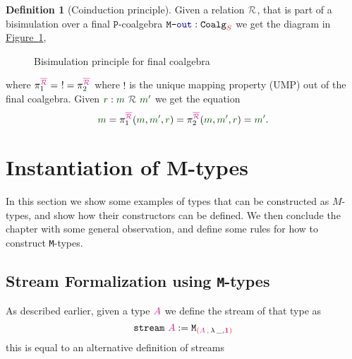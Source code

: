 \documentclass[twoside,11pt,openright]{report}
\theoremstyle{plain} %
\theoremstyle{definition}
\newtheorem{defn}[thm]{Definition}%
\theoremstyle{remark}
\newcommand*{\figref}[1]{\hyperref[fig:#1]{Figure~\ref*{fig:#1}}}
\newcommand*{\term}[1]{\textcolor{green!30!black}{#1}} %
\newcommand*{\type}[1]{\textcolor{magenta!90!black}{#1}}
\newcommand*{\container}[1]{\textcolor{red}{#1}}
\newcommand*{\containerpair}[2]{\ensuremath{\colorlet{savedleftcolor}{.}\color{red}\left(\color{savedleftcolor}#1\,\textcolor{red}{\mathbf{,}}\,#2\color{red}\right)\color{savedleftcolor}}}
\newcommand*{\unit}{\type{\textbf{1}}}
\newcommand*{\coalg}[2]{#1\texttt{-}#2}
\newcommand*{\relation}[1]{\textcolor{gray!75!black}{\ensuremath{\mathtt{#1}}}}
\newcommand*{\function}[1]{\textcolor{blue!60!black}{\ensuremath{\mathtt{#1}}}}
\newcommand*{\typeformer}[1]{\ensuremath{\mathtt{#1}}}
\newcommand*{\functor}[1]{\ensuremath{\mathbf{\mathtt{#1}}}}
\begin{document}
\begin{defn}[Coinduction principle]
  \noindent Given a relation \(\relation{\mathcal{R}}\), that is part of a bisimulation over a final \(\functor{P}\)-coalgebra \(\coalg{\typeformer{M}}{\function{out}}:\mathtt{Coalg}_{\container{S}}\) we get the diagram in \figref{final-coalgebra-coinduction},
  \begin{figure}[h]
    \centering
    \caption{Bisimulation principle for final coalgebra}
    \label{fig:final-coalgebra-coinduction}
  \end{figure}
  \noindent where \(\pi_1^{\type{\overline{\mathcal{R}}}} = ~! = \pi_2^{\type{\overline{\mathcal{R}}}}\)  where \(!\) is the unique mapping property (UMP) out of the final coalgebra. Given \(\term{r} : \term{m}~\relation{\mathcal{R}}~\term{m'}\) we get the equation
  \begin{equation}
    \term{m} = \pi_1^{\type{\overline{\mathcal{R}}}} (\term{m}, \term{m'}, \term{r}) = \pi_2^{\type{\overline{\mathcal{R}}}} (\term{m}, \term{m'}, \term{r}) = \term{m'}.
  \end{equation}
\end{defn}


\chapter{Instantiation of M-types}
In this section we show some examples of types that can be constructed as \(M\)-types, and show how their constructors can be defined. We then conclude the chapter with some general observation, and define some rules for how to construct \texttt{M}-types. 


\section{Stream Formalization using \texttt{M}-types}
As described earlier, given a type \(\type{A}\) we define the stream of that type as
\begin{equation}
  \typeformer{stream}~\type{A} := \typeformer{M}_{\containerpair{\type{A}}{\lambda\,\_,\unit}}
\end{equation}
this is equal to an alternative definition of streams 
\end{document}
